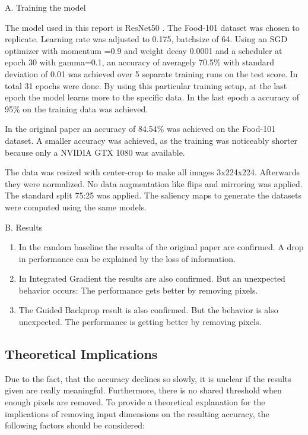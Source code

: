 A. Training the model

The model used in this report is ResNet50 \cite{he2015deep}. The Food-101 \cite{bossard14} dataset was chosen to replicate. Learning rate was adjusted to 0.175, batchsize of 64. Using an SGD optimizer with momentum =0.9 and weight decay 0.0001 and a scheduler at epoch 30 with gamma=0.1, an accuracy of averagely 70.5\% with standard deviation of 0.01  was achieved over 5 separate training runs on the test score. In total 31 epochs were done. 
By using this particular training setup, at the last epoch the model learns more to the specific data. In the last epoch a accuracy of 95\% on the training data was achieved.

In the original paper an accuracy of 84.54\% was achieved on the Food-101 dataset.  A smaller accuracy was achieved, as the training was noticeably shorter because only a NVIDIA GTX 1080 was available.

The data was resized with center-crop to make all images 3x224x224. Afterwards they were normalized. No data augmentation like flips and mirroring was applied. The standard split 75:25 was applied. The saliency maps to generate the datasets were computed using the same models.

B. Results


\begin{enumerate}
	\item In the random baseline the results of the original paper are confirmed. A drop in performance can be explained by the loss of information.
	\item In Integrated Gradient the results are also confirmed. But an unexpected behavior occurs: The performance gets better by removing pixels. 
	\item The Guided Backprop result is also confirmed. But the behavior is also unexpected. The performance is getting better by removing pixels.
\end{enumerate}



\subsection{Theoretical Implications}


Due to the fact, that the accuracy declines so slowly, it is unclear if the results given are really meaningful. Furthermore, there is no shared threshold when enough pixels are removed.
To provide a theoretical explanation for the implications of removing input dimensions on the resulting accuracy, the following factors should be considered:

